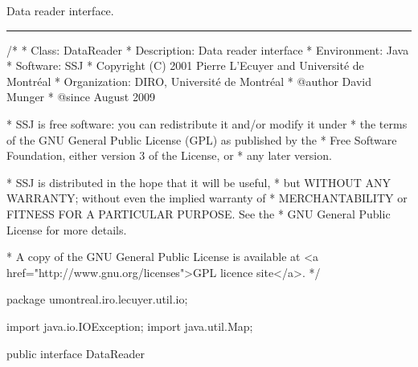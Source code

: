 
Data reader interface.

\bigskip\hrule

\begin{code}
\begin{hide}
/*
 * Class:        DataReader
 * Description:  Data reader interface
 * Environment:  Java
 * Software:     SSJ 
 * Copyright (C) 2001  Pierre L'Ecuyer and Université de Montréal
 * Organization: DIRO, Université de Montréal
 * @author       David Munger 
 * @since        August 2009

 * SSJ is free software: you can redistribute it and/or modify it under
 * the terms of the GNU General Public License (GPL) as published by the
 * Free Software Foundation, either version 3 of the License, or
 * any later version.

 * SSJ is distributed in the hope that it will be useful,
 * but WITHOUT ANY WARRANTY; without even the implied warranty of
 * MERCHANTABILITY or FITNESS FOR A PARTICULAR PURPOSE.  See the
 * GNU General Public License for more details.

 * A copy of the GNU General Public License is available at
   <a href="http://www.gnu.org/licenses">GPL licence site</a>.
 */
\end{hide}
package umontreal.iro.lecuyer.util.io;
\begin{hide}
import java.io.IOException;
import java.util.Map;
\end{hide}

public interface DataReader \begin{hide} {
\end{hide}
\end{code}

